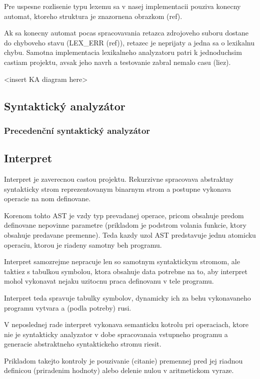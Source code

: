 \documentclass[12pt,a4paper,titlepage,final]{article}
\begin{document}
Pre uspesne rozlisenie typu lexemu sa v nasej implementacii pouziva konecny
automat, ktoreho struktura je znazornena obrazkom (ref).

Ak sa konecny automat pocas spracovavania retazca zdrojoveho suboru dostane do
chyboveho stavu (LEX_ERR (ref)), retazec je neprijaty a jedna sa o lexikalnu
chybu. Samotna implementacia lexikalneho analyzatoru patri k jednoduchsim
castiam projektu, avsak jeho navrh a testovanie zabral nemalo casu (liez).

<insert KA diagram here>


\subsection{Syntaktický analyzátor} \label{syntakticky_analyzator}
\subsubsection{Precedenční syntaktický analyzátor} \label{precedencni_syntakticky_analyzator}
\subsection{Interpret} \label{interpret}

Interpret je zaverecnou castou projektu. Rekurzivne spracovava abstraktny
syntakticky strom reprezentovanym binarnym strom a postupne vykonava operacie
na nom definovane.

Korenom tohto AST je vzdy typ prevadanej operace, pricom obsahuje predom
definovane nepovinne parametre (prikladom je podstrom volania funkcie, ktory
obsahuje predavane premenne). Teda kazdy uzol AST predstavuje jednu atomicku
operaciu, ktorou je riadeny samotny beh programu.

Interpret samozrejme nepracuje len so samotnym syntaktickym stromom, ale
taktiez s tabulkou symbolou, ktora obsahuje data potrebne na to, aby interpret
mohol vykonavat nejaku uzitocnu praca definovanu v tele programu.

Interpret teda spravuje tabulky symbolov, dynamicky ich za behu
vykonavaneho programu vytvara a (podla potreby) rusi.

V neposlednej rade interpret vykonava semanticku kotrolu pri operaciach, ktore
nie je syntakticky analyzator v dobe spracovanaia vstupneho programu a generacie
abstraktneho syntaktickeho stromu riesit.

Prikladom takejto kontroly je pouzivanie (citanie) premennej pred jej riadnou
definicou (priradenim hodnoty) alebo delenie nulou v aritmetickom vyraze.
\end{document}
